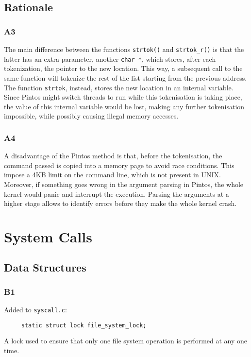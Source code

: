 \documentclass[a4wide, 11pt]{article}
\newcommand{\tab}{\hspace*{2em}}
\newcommand{\tx}{\texttt}
\begin{document}
\subsection{Rationale}
\subsubsection{A3}
The main difference between the functions \tx{strtok()} and \tx{strtok\_r()} is that the latter has an extra parameter, another \tx{char *}, which stores, after each tokenization, the pointer to the new location. This way, a subsequent call to the same function will tokenize the rest of the list starting from the previous address. The function \tx{strtok}, instead, stores the new location in an internal variable. Since Pintos might switch threads to run while this tokenisation is taking place, the value of this internal variable would be lost, making any further tokenisation impossible, while possibly causing illegal memory accesses.
\subsubsection{A4}
A disadvantage of the Pintos method is that, before the tokenisation, the command passed is copied into a memory page to avoid race conditions. This impose a 4KB limit on the command line, which is not present in UNIX. \\
Moreover, if something goes wrong  in the argument parsing in Pintos, the whole kernel would panic and interrupt the execution. Parsing the arguments at a higher stage allows to identify errors before they make the whole kernel crash.

\section{System Calls}
\subsection{Data Structures}
\subsubsection{B1}

Added to \tx{syscall.c}:

\begin{verbatim}
     static struct lock file_system_lock;
\end{verbatim}

\tab A lock used to ensure that only one file system operation is performed at any one time.
\end{document}
